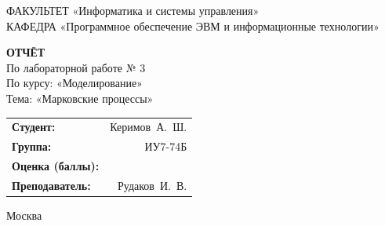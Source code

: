 \begin{titlepage}
{	{\doublespacing \small \raggedright ФАКУЛЬТЕТ \hspace{37mm} «Информатика и системы управления»\\
	КАФЕДРА \hspace{17mm} «Программное обеспечение ЭВМ и информационные технологии»\\}

	\vspace{30mm}

	\textbf{ОТЧЁТ}\\
	По лабораторной работе № 3\\
	По курсу: «Моделирование»\\
	Тема: «Марковские процессы»\\

	\vspace{40mm}

	\begin{flushleft}
		\begin{tabular}{lr}
			\textbf{Студент:}        & Керимов~А.~Ш. \\
			\textbf{Группа:}         & ИУ7-74Б       \\
			\textbf{Оценка (баллы):} & \hrulefill    \\
			\textbf{Преподаватель:}  & Рудаков~И.~В. \\
		\end{tabular}
	\end{flushleft}

	\vfill

	Москва\\
	\the\year\\}
\end{titlepage}

\setcounter{page}{2}
